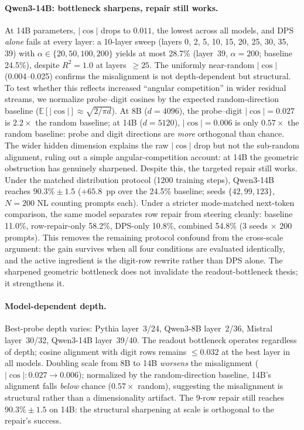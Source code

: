 \documentclass{article}
\begin{document}
\paragraph{Qwen3-14B: bottleneck sharpens, repair still works.}
At 14B parameters, $|\cos|$ drops to $0.011$, the lowest across all models, and
DPS \emph{alone} fails at every layer: a 10-layer sweep (layers 0, 2, 5, 10, 15, 20, 25, 30, 35, 39)
with $\alpha \in \{20, 50, 100, 200\}$ yields at most 28.7\% (layer~39, $\alpha{=}200$;
baseline 24.5\%), despite $R^2 = 1.0$ at layers~$\geq 25$.
The uniformly near-random $|\cos|$ (0.004--0.025) confirms the misalignment is not
depth-dependent but structural.
To test whether this reflects increased ``angular competition'' in wider residual
streams, we normalize probe--digit cosines by the expected random-direction
baseline ($\mathbb{E}[|\cos|] \approx \sqrt{2/\pi d}$).
At 8B (${d{=}4096}$), the probe--digit $|\cos|{=}0.027$ is $2.2\times$ the random
baseline; at 14B (${d{=}5120}$), $|\cos|{=}0.006$ is only $0.57\times$ the random
baseline: probe and digit directions are \emph{more} orthogonal than chance.
The wider hidden dimension explains the raw $|\cos|$ drop but not the sub-random
alignment, ruling out a simple angular-competition account: at 14B the geometric
obstruction has genuinely sharpened.
Despite this, the targeted repair still works.
Under the matched distribution protocol (1200 training steps), Qwen3-14B reaches
\emph{$90.3\% \pm 1.5$} ($+65.8$~pp over the 24.5\% baseline; seeds $\{42, 99, 123\}$,
$N{=}200$ NL counting prompts each).
Under a stricter mode-matched next-token comparison, the same model separates row
repair from steering cleanly: baseline 11.0\%, row-repair-only 58.2\%,
DPS-only 10.8\%, combined 54.8\% (3 seeds $\times$ 200 prompts). This removes the
remaining protocol confound from the cross-scale argument: the gain survives when
all four conditions are evaluated identically, and the active ingredient is the
digit-row rewrite rather than DPS alone.
The sharpened geometric bottleneck does not invalidate the readout-bottleneck thesis; it
strengthens it.

\paragraph{Model-dependent depth.}
Best-probe depth varies: Pythia layer~3/24, Qwen3-8B layer~2/36,
Mistral layer~30/32, Qwen3-14B layer~39/40.
The readout bottleneck operates regardless of depth; cosine alignment
with digit rows remains $\leq 0.032$ at the best layer in all models.
Doubling scale from 8B to 14B \emph{worsens} the misalignment
($|\cos|: 0.027 \to 0.006$); normalized by the random-direction baseline,
14B's alignment falls \emph{below} chance ($0.57\times$ random), suggesting
the misalignment is structural rather than a dimensionality artifact.
The 9-row repair still reaches $90.3\% \pm 1.5$ on 14B:
the structural sharpening at scale is orthogonal to the repair's success.
\end{document}
